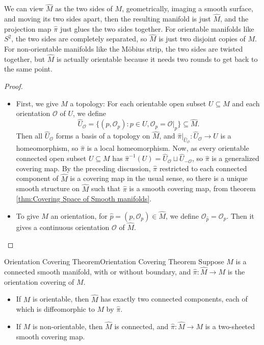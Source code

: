 \documentclass[../main.tex]{subfiles}
\begin{document}
\begin{remark}
  We can view $\hat{M}$ as the two sides of $M$, geometrically, imaging a smooth surface, and moving its two sides apart, then the resulting manifold is just $\hat{M}$, and the projection map $\hat{\pi}$ just glues the two sides together. For orientable manifolds like $S^2$, the two sides are completely separated, so $\hat{M}$ is just two disjoint copies of $M$. For non-orientable manifolds like the M\"obius strip, the two sides are twisted together, but $\hat{M}$ is actually orientable because it needs two rounds to get back to the same point.
\end{remark}
\begin{proof}
  \begin{itemize}
    \item First, we give $\hat{M}$ a topology: For each orientable open subset $U \subseteq M$ and each orientation $\mathcal{O}$ of $U$, we define
      \begin{equation*}
        \hat{U}_\mathcal{O} = \{(p, \mathcal{O}_p) : p \in U, \mathcal{O}_p = \mathcal{O}|_p\} \subseteq \hat{M}.
      \end{equation*}
      Then all $\hat{U}_\mathcal{O}$ forms a basis of a topology on $\hat{M}$, and $\hat{\pi}|_{\hat{U}_\mathcal{O}} : \hat{U}_\mathcal{O} \to U$ is a homeomorphism, so $\hat{\pi}$ is a local homeomorphism. Now, as every orientable connected open subset $U \subseteq M$ has $\hat{\pi}^{-1}(U) = \hat{U}_\mathcal{O} \sqcup \hat{U}_{-\mathcal{O}}$, so $\hat{\pi}$ is a generalized covering map. By the preceding discussion, $\hat{\pi}$ restricted to each connected component of $\hat{M}$ is a covering map in the usual sense, so there is a unique smooth structure on $\hat{M}$ such that $\hat{\pi}$ is a smooth covering map, from theorem \ref{thm:Covering Space of Smooth manifolds}.

    \item To give $M$ an orientation, for $\hat{p} = (p, \mathcal{O}_p) \in \hat{M}$, we define $\mathcal{O}_{\hat{p}} = \mathcal{O}_p$. Then it gives a continuous orientation $\mathcal{O}$ of $\hat{M}$.
  \end{itemize}
\end{proof}

\begin{theorem}{Orientation Covering Theorem}{Orientation Covering Theorem}
  Suppose $M$ is a connected smooth manifold, with or without boundary, and $\hat{\pi} : \hat{M} \to M$ is the orientation covering of $M$.
  \begin{itemize}
    \item If $M$ is orientable, then $\hat{M}$ has exactly two connected components, each of which is diffeomorphic to $M$ by $\hat{\pi}$.
    \item If $M$ is non-orientable, then $\hat{M}$ is connected, and $\hat{\pi} : \hat{M} \to M$ is a two-sheeted smooth covering map.
  \end{itemize}
\end{theorem}
\end{document}
